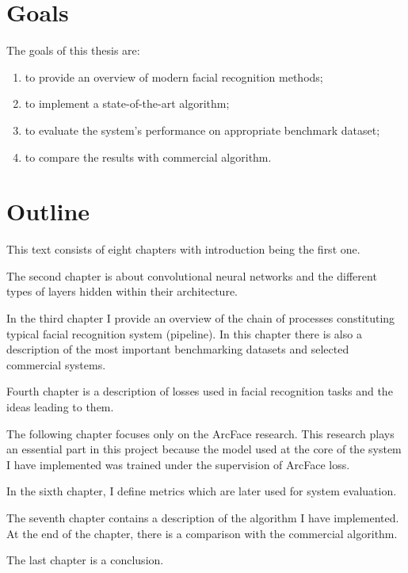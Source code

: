\section{Goals}\label{sec:goals}
The goals of this thesis are:
\begin{enumerate}
    \item to provide an overview of modern facial recognition methods;
    \item to implement a state-of-the-art algorithm;
    \item to evaluate the system's performance on appropriate benchmark dataset;
    \item to compare the results with commercial algorithm.
\end{enumerate}

\section{Outline}\label{sec:outline}
This text consists of eight chapters with introduction being the first one.

The second chapter is about convolutional neural networks and the different types of layers hidden within their
architecture.

In the third chapter I provide an overview of the chain of processes constituting typical facial recognition system
(pipeline).
In this chapter there is also a description of the most important benchmarking datasets and selected commercial
systems.

Fourth chapter is a description of losses used in facial recognition tasks and the ideas leading to them.

The following chapter focuses only on the ArcFace research.
This research plays an essential part in this project because the model used at the core of the system I have
implemented was trained under the supervision of ArcFace loss.

In the sixth chapter, I define metrics which are later used for system evaluation.

The seventh chapter contains a description of the algorithm I have implemented.
At the end of the chapter, there is a comparison with the commercial algorithm.

The last chapter is a conclusion.